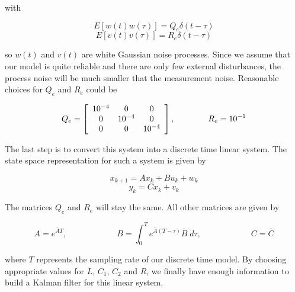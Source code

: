 \documentclass{article}
\begin{document}
with

\[E[w(t)w(\tau)] = Q_e \delta(t-\tau)\]
\[E[v(t)v(\tau)] = R_e \delta(t-\tau)\]

so \(w(t)\) and \(v(t)\) are white Gaussian noise processes. Since we assume that our model is quite reliable and there are only few external disturbances, the process noise will be much smaller that the measurement noise. Reasonable choices for \(Q_e\) and \(R_e\) could be

\[
Q_e = \left[
\begin{array}{c c c}
10^{-4} & 0 & 0 \\
0 & 10^{-4} & 0 \\
0 & 0 & 10^{-4} \\
\end{array}
\right]
, \qquad\qquad R_e = 10^{-1}
\]

The last step is to convert this system into a discrete time linear system. The state space representation for such a system is given by

\[x_{k+1} = Ax_k + Bu_k + w_k\]
\[y_k = Cx_k + v_k\]

The matrices \(Q_e\) and \(R_e\) will stay the same. All other matrices are given by

\[A = e^{\bar{A} T}, \qquad\qquad\qquad B = \int_0^T e^{\bar{A} (T-\tau)} \bar{B} \;d\tau, \qquad\qquad\qquad C = \bar{C}\]

where \(T\) represents the sampling rate of our discrete time model. By choosing appropriate values for \(L\), \(C_1\), \(C_2\) and \(R\), we finally have enough information to build a Kalman filter for this linear system.
\end{document}
